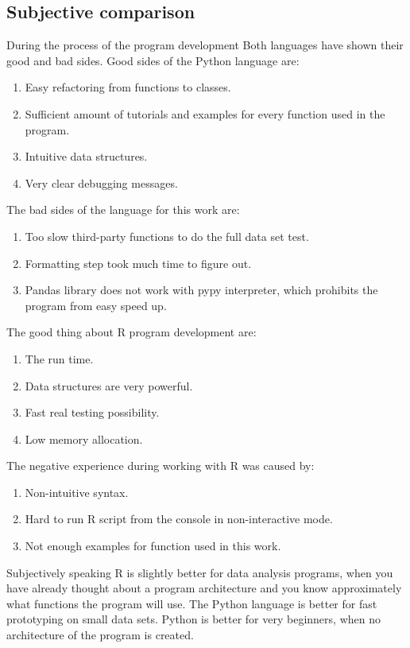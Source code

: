 \documentclass{article}
\begin{document}
\subsection{Subjective comparison}
During the process of the program development Both languages have shown their good and bad sides. Good sides of the Python language are:
\begin{enumerate}
    \item Easy refactoring from functions to classes.
    \item Sufficient amount of tutorials and examples for every function used in the program.
    \item Intuitive data structures.
    \item Very clear debugging messages.
\end{enumerate}
The bad sides of the language for this work are:
\begin{enumerate}
    \item Too slow third-party functions to do the full data set test.
    \item Formatting step took much time to figure out.
    \item Pandas library does not work with pypy interpreter, which prohibits the program from easy speed up.
\end{enumerate} 
The good thing about R program development are:
\begin{enumerate}
    \item The run time.
    \item Data structures are very powerful.
    \item Fast real testing possibility.
    \item Low memory allocation.
\end{enumerate}
The negative experience during working with R was caused by:
\begin{enumerate}
    \item Non-intuitive syntax.
    \item Hard to run R script from the console in non-interactive mode.
    \item Not enough examples for function used in this work.
\end{enumerate} 
Subjectively speaking R is slightly better for data analysis programs, when you have already thought about a program architecture and you know approximately what functions the program will use. The Python language is better for fast prototyping on small data sets. Python is better for very beginners, when no architecture of the program is created.
  
\end{document}
